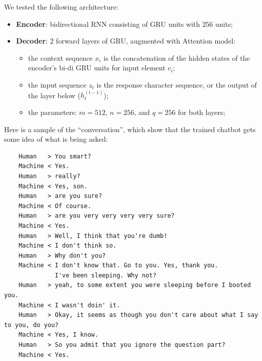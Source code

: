 \documentclass[12pt,a4paper]{article}
\begin{document}
We tested the following architecture:
\begin{itemize}
    \item \textbf{Encoder}: bidirectional RNN consisting of GRU units with $256$ units;
    \item \textbf{Decoder}: $2$ forward layers of GRU, augmented with Attention model:
        \begin{itemize}
            \item the context sequence $x_i$ is the concatenation of the hidden
            states of the encoder's bi-di GRU units for input element $c_i$;
            \item the input sequence $z_t$ is the response character sequence,
            or the output of the layer below ($h^{(l-1)}_t$);
            \item the parameters: $m=512$, $n=256$, and $q=256$ for both layers;
        \end{itemize}
\end{itemize}
Here is a sample of the ``conversation'', which show that the trained chatbot gets
some idea of what is being asked: 
\footnotesize{
\begin{verbatim}
    Human   > You smart?
    Machine < Yes.
    Human   > really?
    Machine < Yes, son.
    Human   > are you sure?
    Machine < Of course.
    Human   > are you very very very very sure?
    Machine < Yes.
    Human   > Well, I think that you're dumb!
    Machine < I don't think so.
    Human   > Why don't you?
    Machine < I don't know that. Go to you. Yes, thank you.
              I've been sleeping. Why not?
    Human   > yeah, to some extent you were sleeping before I booted you.
    Machine < I wasn't doin' it.
    Human   > Okay, it seems as though you don't care about what I say to you, do you?
    Machine < Yes, I know.
    Human   > So you admit that you ignore the question part?
    Machine < Yes.
\end{verbatim}
}

\end{document}

